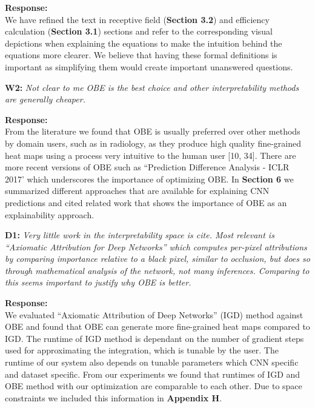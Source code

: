 \documentclass[preprint]{vldb}
\begin{document}
\vspace{2mm}
\noindent \textbf{Response:}\\
We have refined the text in receptive field (\textbf{Section 3.2}) and efficiency calculation (\textbf{Section 3.1}) sections and refer to the corresponding visual depictions when explaining the equations to make the intuition behind the equations more clearer.
We believe that having these formal definitions is important as simplifying
them would create important unanswered questions.

\vspace{2mm}
\noindent \textbf{W2:} \textit{Not clear to me OBE is the best choice and other interpretability methods are generally cheaper.}

\vspace{2mm}
\noindent \textbf{Response:} \\
From the literature we found that OBE is usually preferred over other methods by domain users, such as in radiology, as they produce high quality fine-grained heat maps using a process very intuitive to the human user [10, 34].
There are more recent versions of OBE such as ``Prediction Difference Analysis - ICLR 2017' which underscores the importance of optimizing OBE.
In \textbf{Section 6} we summarized different approaches that are available for explaining CNN predictions and cited related work that shows the importance of OBE as an explainability approach.


\vspace{2mm}
\noindent \textbf{D1:} \textit{Very little work in the interpretability space is cite. Most relevant is ``Axiomatic Attribution for Deep Networks'' which computes per-pixel attributions by comparing importance relative to a black pixel, similar to occlusion, but does so through mathematical analysis of the network, not many inferences. Comparing to this seems important to justify why OBE is better.}

\vspace{2mm}
\noindent \textbf{Response:} \\
We evaluated ``Axiomatic Attribution of Deep Networks'' (IGD) method against OBE and found that OBE can generate more fine-grained heat maps compared to IGD.
The runtime of IGD method is dependant on the number of gradient steps used for approximating the integration, which is tunable by the user. 
The runtime of our system also depends on tunable parameters which CNN specific and dataset specific.
From our experiments we found that runtimes of IGD and OBE method with our optimization are comparable to each other.
Due to space constraints we included this information in \textbf{Appendix H}.
\end{document}
